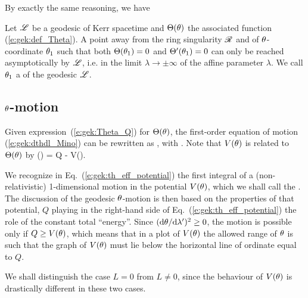 By exactly the same reasoning, we have
\begin{greybox}
Let $\mathscr{L}$ be a geodesic of Kerr spacetime and $\Theta(\theta)$ the associated function
(\ref{e:gek:def_Theta}).
A point away from the ring singularity $\mathscr{R}$ and of $\theta$-coordinate $\theta_1$
such that both $\Theta(\theta_1) = 0$ and $\Theta'(\theta_1) = 0$
can only be reached asymptotically by $\mathscr{L}$, i.e. in the limit
$\lambda\to \pm\infty$ of the affine parameter
$\lambda$. We call $\theta_1$ a  of the geodesic $\mathscr{L}$.
\end{greybox}



\subsection{$\theta$-motion} \label{s:gek:th_motion}

Given expression~(\ref{e:gek:Theta_Q}) for $\Theta(\theta)$,
the first-order equation of motion (\ref{e:gek:dthdl_Mino}) can be rewritten as
\be \label{e:gek:th_eff_potential}
    ,
\ee
with
\be \label{e:gek:def_V_th}
  .
\ee
Note that $V(\theta)$ is related to $\Theta(\theta)$ by
\be
    \Theta(\th) = Q - V(\th).
\ee

We recognize in Eq.~(\ref{e:gek:th_eff_potential}) the first integral of a
(non-relativistic) 1-dimensional motion in the potential $V(\theta)$, which we
shall call the
. The discussion of the geodesic $\theta$-motion
is then based on the properties of that potential, $Q$ playing in the right-hand side
of Eq.~(\ref{e:gek:th_eff_potential}) the role of
the constant total ``energy''. Since $(\mathrm{d}\theta / \mathrm{d}\lambda')^2 \geq 0$, the
motion is possible only if $Q\geq V(\theta)$, which means that in a plot of $V(\theta)$
the allowed range of $\theta$ is such that the graph of $V(\theta)$ must lie below
the horizontal line of ordinate equal to $Q$.

We shall distinguish the
case $L=0$ from $L\not=0$, since the behaviour of $V(\theta)$ is drastically different
in these two cases.

